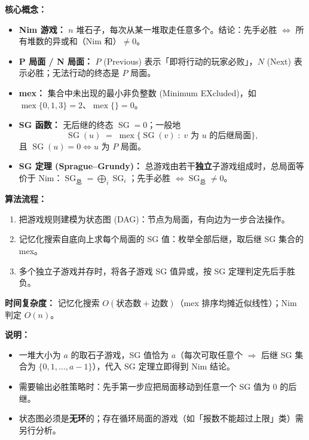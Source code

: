 \textbf{核心概念：}
\begin{itemize}
    \item \textbf{Nim 游戏：} $n$ 堆石子，每次从某一堆取走任意多个。结论：先手必胜 $\iff$ 所有堆数的异或和（Nim 和）$\ne 0$。
    \item \textbf{P 局面 / N 局面：} $P$ (Previous) 表示「即将行动的玩家必败」，$N$ (Next) 表示必胜；无法行动的终态是 $P$ 局面。
    \item \textbf{mex：} 集合中未出现的最小非负整数 (Minimum EXcluded)，如 $\operatorname{mex}\{0,1,3\}=2$、$\operatorname{mex}\{\}=0$。
    \item \textbf{SG 函数：} 无后继的终态 $\operatorname{SG}=0$；一般地
    \[ \operatorname{SG}(u) \;=\; \operatorname{mex}\{\operatorname{SG}(v) \;:\; v \text{ 为 } u \text{ 的后继局面}\}, \]
    且 $\operatorname{SG}(u)=0 \iff u$ 为 $P$ 局面。
    \item \textbf{SG 定理 (Sprague--Grundy)：} 总游戏由若干\textbf{独立}子游戏组成时，总局面等价于 Nim：$\operatorname{SG}_{\text{总}}=\bigoplus_i \operatorname{SG}_i$；先手必胜 $\iff \operatorname{SG}_{\text{总}}\ne 0$。
\end{itemize}

\textbf{算法流程：}
\begin{enumerate}
    \item 把游戏规则建模为状态图 (DAG)：节点为局面，有向边为一步合法操作。
    \item 记忆化搜索自底向上求每个局面的 SG 值：枚举全部后继，取后继 SG 集合的 mex。
    \item 多个独立子游戏并存时，将各子游戏 SG 值异或，按 SG 定理判定先后手胜负。
\end{enumerate}

\textbf{时间复杂度：} 记忆化搜索 $O(\text{状态数}+\text{边数})$（mex 排序均摊近似线性）；Nim 判定 $O(n)$。



\textbf{说明：}
\begin{itemize}
    \item 一堆大小为 $a$ 的取石子游戏，SG 值恰为 $a$（每次可取任意个 $\Rightarrow$ 后继 SG 集合为 $\{0,1,\dots,a-1\}$），代入 SG 定理立即得到 Nim 结论。
    \item 需要输出必胜策略时：先手第一步应把局面移动到任意一个 SG 值为 $0$ 的后继。
    \item 状态图必须是\textbf{无环}的；存在循环局面的游戏（如「报数不能超过上限」类）需另行分析。
\end{itemize}

